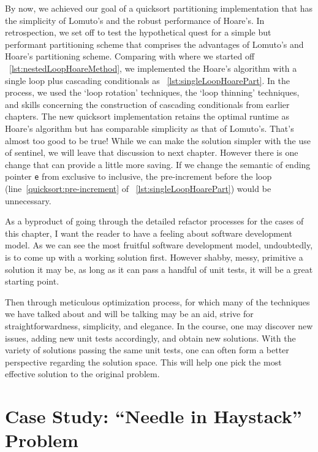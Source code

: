 \documentclass[oneside,11pt]{book}
\theoremstyle{definition}
\theoremstyle{remark}
\newcommand{\code}[1]{\mbox{\lstinline{#1}}}
\begin{document}
By now,
we achieved our goal of a quicksort partitioning implementation that has the simplicity of
Lomuto's and the robust performance of Hoare's.
In retrospection, we set off to test the hypothetical quest for a simple but performant
partitioning scheme that comprises the advantages of Lomuto's and Hoare's partitioning scheme.
Comparing with where we started off ~\autoref{lst:nestedLoopHoareMethod},
we implemented the Hoare's algorithm with a single loop plus
cascading conditionals as ~\autoref{lst:singleLoopHoarePart}.
In the process, we used the `loop rotation' techniques, the `loop thinning' techniques,
and skills concerning the construction of cascading conditionals from earlier chapters.
The new quicksort implementation retains the optimal runtime as Hoare's algorithm but has
comparable simplicity as that of Lomuto's.
That's almost too good to be true!
While we can make the solution simpler with the use of sentinel, we will leave that discussion to
next chapter.
However there is one change that can provide a little more saving.
If we change the semantic of ending pointer \code{e} from exclusive to inclusive, the
pre-increment before the loop (line~\ref{quicksort:pre-increment} of
~\autoref{lst:singleLoopHoarePart}) would be unnecessary.


As a byproduct of going through the detailed refactor
processes for the cases of this chapter, I want the reader to have a feeling about software
development model.
As we can see the most fruitful software development model, undoubtedly, is to come up with a
working solution first.
However shabby, messy, primitive a solution it may be, as long as it can pass a handful of unit
tests, it will be a great starting point.


Then through meticulous optimization process, for which many of the techniques we have talked
about and will be talking may be an aid, strive for straightforwardness, simplicity, and elegance.
In the course, one may discover new issues, adding new unit tests accordingly, and obtain new
solutions.
With the variety of solutions passing the same unit tests, one can often form a better
perspective regarding the solution space.
This will help one pick the most effective solution to the original problem.










\section{Case Study: ``Needle in Haystack'' Problem}\label{sec:nested-loop-pattern-matching}
\end{document}
